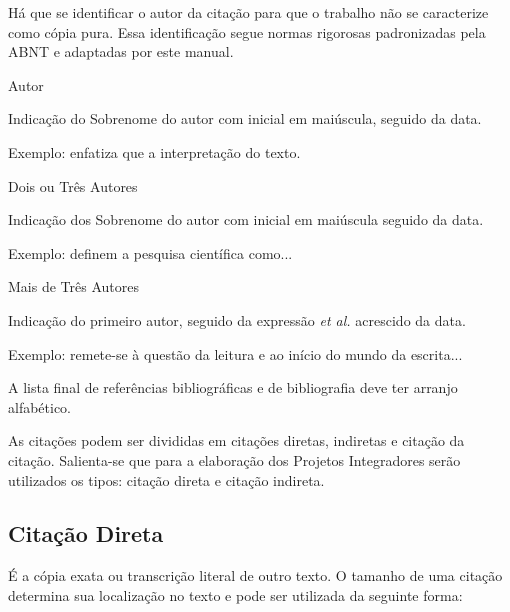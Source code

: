 \documentclass[
	12pt,				%
	openright,			%
	oneside,			%
	a4paper,			%
	english,			%
	french,				%
	spanish,			%
	brazil				%
	]{abntex2}
\begin{document}
\par Há que se identificar o autor da citação para que o trabalho não se caracterize como cópia pura. Essa identificação segue normas rigorosas padronizadas pela ABNT e adaptadas por este manual.

\begin{alineas} %
\item Autor
\par Indicação do Sobrenome do autor com inicial em maiúscula, seguido da data.
\par Exemplo:  enfatiza que a interpretação do texto.
\item Dois ou Três Autores
\par Indicação dos Sobrenome do autor com inicial em maiúscula seguido da data.
\par Exemplo:  definem a pesquisa científica como... 
\item Mais de Três Autores
\par Indicação do primeiro autor, seguido da expressão \textit{et al.} acrescido da data.
\par Exemplo:  remete-se à questão da leitura e ao início do mundo da escrita...
\end{alineas}

\par A lista final de referências bibliográficas e de bibliografia deve ter arranjo alfabético.

\par As citações podem ser divididas em citações diretas, indiretas e citação da citação. Salienta-se que para a elaboração dos Projetos Integradores serão utilizados os tipos: citação direta e citação indireta.

\subsection{Citação Direta}
\par É a cópia exata ou transcrição literal de outro texto. O tamanho de uma citação determina sua localização no texto e pode ser utilizada da seguinte forma:
\end{document}
